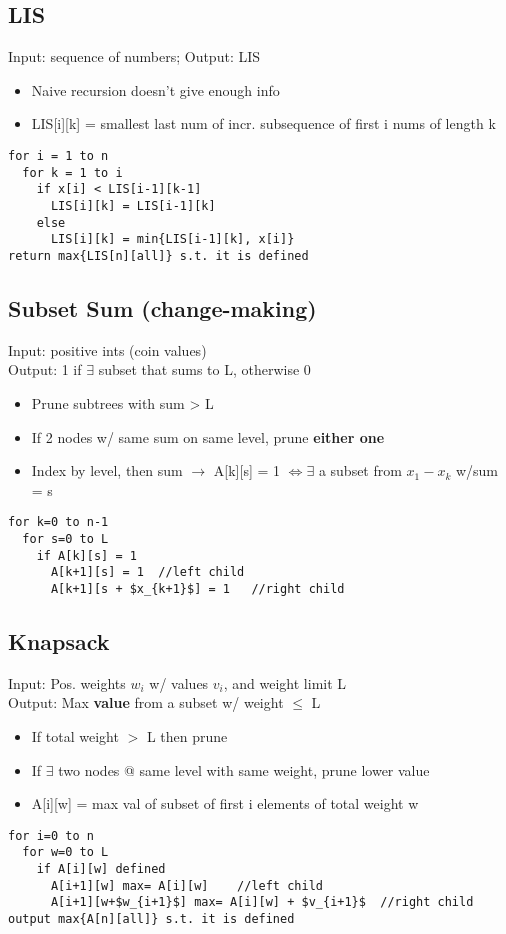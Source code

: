 \documentclass[12pt]{article}
\begin{document}
\subsection{LIS}
Input: sequence of numbers; Output: LIS\\
\begin{itemize}
  \item Naive recursion doesn't give enough info
  \item LIS[i][k] = smallest last num of incr. subsequence of first i nums of length k
\end{itemize}
\begin{verbatim}
for i = 1 to n
  for k = 1 to i
    if x[i] < LIS[i-1][k-1]
      LIS[i][k] = LIS[i-1][k]
    else
      LIS[i][k] = min{LIS[i-1][k], x[i]}
return max{LIS[n][all]} s.t. it is defined
\end{verbatim}


\subsection{Subset Sum (change-making)}
Input: positive ints (coin values)\\
Output: 1 if $\exists$ subset that sums to L, otherwise 0\\
\begin{itemize}
  \item Prune subtrees with sum > L
  \item If 2 nodes w/ same sum on same level, prune \textbf{either one}
  \item Index by level, then sum $\rightarrow$ A[k][s] = 1 $\iff \exists$ a subset from $x_1 - x_k$ w/sum = s
\end{itemize}
\begin{lstlisting}
for k=0 to n-1
  for s=0 to L
    if A[k][s] = 1
      A[k+1][s] = 1  //left child
      A[k+1][s + $x_{k+1}$] = 1   //right child
\end{lstlisting}


\subsection{Knapsack}
Input: Pos. weights $w_i$ w/ values $v_i$, and weight limit L\\
Output: Max \textbf{value} from a subset w/ weight $\leq$ L\\
\begin{itemize}
  \item If total weight $>$ L then prune
  \item If $\exists$ two nodes @ same level with same weight, prune lower value
  \item A[i][w] = max val of subset of first i elements of total weight w
\end{itemize}
\begin{lstlisting}
for i=0 to n
  for w=0 to L
    if A[i][w] defined
      A[i+1][w] max= A[i][w]    //left child
      A[i+1][w+$w_{i+1}$] max= A[i][w] + $v_{i+1}$  //right child
output max{A[n][all]} s.t. it is defined
\end{lstlisting}
\end{document}
